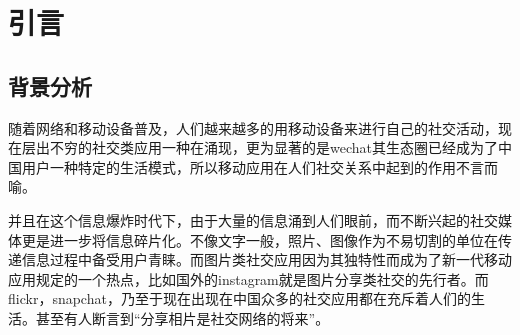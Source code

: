 
\chapter{引言}
\section{背景分析}
随着网络和移动设备普及，人们越来越多的用移动设备来进行自己的社交活动，现在层出不穷的社交类应用一种在涌现，更为显著的是wechat其生态圈已经成为了中国用户一种特定的生活模式，所以移动应用在人们社交关系中起到的作用不言而喻。

并且在这个信息爆炸时代下，由于大量的信息涌到人们眼前，而不断兴起的社交媒体更是进一步将信息碎片化。不像文字一般，照片、图像作为不易切割的单位在传递信息过程中备受用户青睐。而图片类社交应用因为其独特性而成为了新一代移动应用规定的一个热点，比如国外的instagram就是图片分享类社交的先行者。而flickr，snapchat，乃至于现在出现在中国众多的社交应用都在充斥着人们的生活。甚至有人断言到“分享相片是社交网络的将来”。






